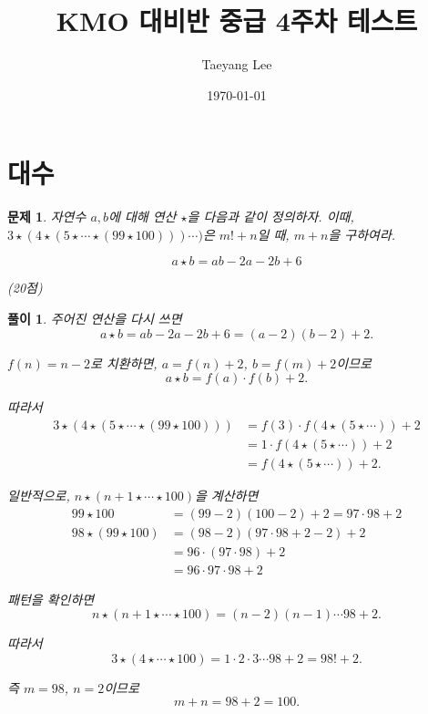 \documentclass[12pt,a4paper]{article}
\title{KMO 대비반 중급 4주차 테스트}
\author{Taeyang Lee}
\date{\today}
\theoremstyle{test_form}
\newtheorem{problem}{문제}[section]
\newtheorem*{solution}{풀이}
\begin{document}
\maketitle
\tableofcontents  %

\newpage

\section{대수}

\begin{problem}

자연수 \(a,b\)에 대해 연산 \(\star\)을 다음과 같이 정의하자. 
이때, \(3 \star (4 \star (5 \star \cdots \star (99 \star 100)))\cdots)\)은 
\(m!+n\)일 때, \(m+n\)을 구하여라.

\[
a \star b = ab - 2a - 2b + 6
\]

\begin{flushright}(20점)\end{flushright}

\end{problem}

\begin{solution}
\setlength{\parindent}{0pt}

주어진 연산을 다시 쓰면
\[
a \star b = ab - 2a - 2b + 6 = (a-2)(b-2) + 2.
\]

\(f(n) = n - 2\)로 치환하면, \(a = f(n) + 2\), \(b = f(m) + 2\)이므로
\[
a \star b = f(a) \cdot f(b) + 2.
\]

따라서
\[
\begin{aligned}
3 \star (4 \star (5 \star \cdots \star (99 \star 100)))
&= f(3) \cdot f(4 \star (5 \star \cdots)) + 2\\
&= 1 \cdot f(4 \star (5 \star \cdots)) + 2\\
&= f(4 \star (5 \star \cdots)) + 2.
\end{aligned}
\]

일반적으로, \(n \star (n+1 \star \cdots \star 100)\)을 계산하면
\[
\begin{aligned}
99 \star 100 &= (99-2)(100-2) + 2 = 97 \cdot 98 + 2\\
98 \star (99 \star 100) &= (98-2)(97 \cdot 98 + 2 - 2) + 2\\
&= 96 \cdot (97 \cdot 98) + 2\\
&= 96 \cdot 97 \cdot 98 + 2
\end{aligned}
\]

패턴을 확인하면
\[
n \star (n+1 \star \cdots \star 100) = (n-2)(n-1) \cdots 98 + 2.
\]

따라서
\[
3 \star (4 \star \cdots \star 100) = 1 \cdot 2 \cdot 3 \cdots 98 + 2 = 98! + 2.
\]

즉 \(m = 98\), \(n = 2\)이므로
\[
m + n = 98 + 2 = 100.
\]

\end{solution}
\end{document}
